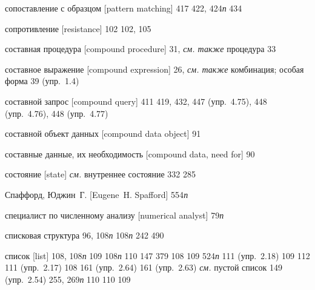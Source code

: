 \begin{theindex}
\item {сопоставление с образцом [pattern matching]} 417
   422, 424{\it п}
   434
\item {сопротивление [resistance]}
   102
   102, 105
\item {составная процедура [compound procedure]} 31, {\it см. также} процедура
   33
\item {составное выражение [compound expression]} 26, {\it см. также} комбинация; особая форма
   39 (упр.~1.4)
\item {составной запрос [compound query]} 411
   419, 432, 447 (упр.~4.75), 448 (упр.~4.76), 448 (упр.~4.77)
\item {составной объект данных [compound data object]} 91
\item {составные данные, их необходимость [compound data, need for]} 90
\item {состояние [state]}
   {\it см.} внутреннее состояние
   332
   285
\item {Спаффорд, Юджин~Г. [Eugene~H. Spafford]} 554{\it п}
\item {специалист по численному анализу [numerical analyst]} 79{\it п}
\item {списковая структура} 96, 108{\it п}
   108{\it п}
   242
   490
\item {список [list]} 108, 108{\it п}
   109
   108{\it п}
   110
   147
   379
   108
   109
   524{\it п}
   111 (упр.~2.18)
   109
   112
   111 (упр.~2.17)
   108
   161 (упр.~2.64)
   161 (упр.~2.63)
   {\it см.} пустой список
   149 (упр.~2.54)
   255, 269{\it п}
   110
   110
   109

\end{theindex}
